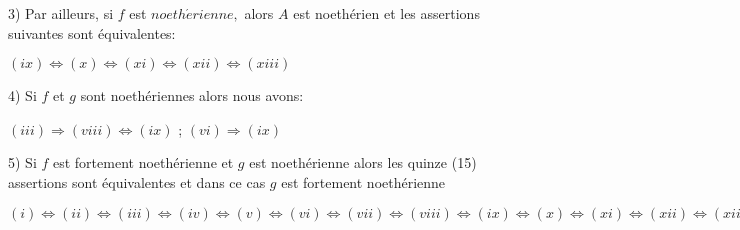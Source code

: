 \begin{montheoreme}
	3) Par ailleurs, si $f$ est $noeth\acute{e}rienne,$ alors $A$ est noethérien et les assertions suivantes sont équivalentes:
	
	$(ix)\Longleftrightarrow (x)\Longleftrightarrow (xi)\Longleftrightarrow
	(xii)\Longleftrightarrow (xiii)$
	
	4) Si $f$ et $g$ sont noethériennes alors nous avons:
	
	$(iii)\Longrightarrow (viii)\Longleftrightarrow (ix)$ ; $(vi)\Longrightarrow (ix)$
	
	5) Si $f$ est fortement noethérienne et $g$ est noethérienne alors les quinze (15) assertions sont équivalentes et dans ce cas $g$ est fortement noethérienne
	
	$(i)\Longleftrightarrow (ii)\Longleftrightarrow (iii)\Longleftrightarrow
	(iv)\Longleftrightarrow (v)\Longleftrightarrow (vi)\Longleftrightarrow
	(vii)\Longleftrightarrow (viii)\Longleftrightarrow (ix)\Longleftrightarrow
	(x)\Longleftrightarrow (xi)\Longleftrightarrow (xii)\Longleftrightarrow
	(xiii)\Longleftrightarrow (xiv)\Longleftrightarrow (xv).$
\end{montheoreme}
